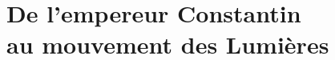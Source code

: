 
\part[De l'empereur Constantin au mouvement des Lumières]{De l'empereur Constantin\\au mouvement des Lumières}










